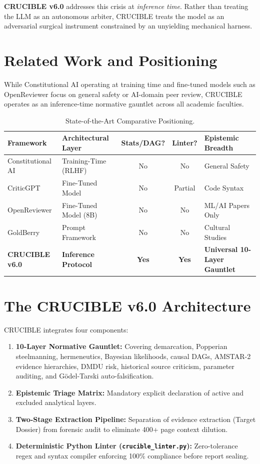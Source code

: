 \documentclass[11pt,a4paper]{article}
\begin{document}
\textbf{CRUCIBLE v6.0} addresses this crisis at \textit{inference time}. Rather than treating the LLM as an autonomous arbiter, CRUCIBLE treats the model as an adversarial surgical instrument constrained by an unyielding mechanical harness.

\section{Related Work and Positioning}
While Constitutional AI operating at training time and fine-tuned models such as OpenReviewer focus on general safety or AI-domain peer review, CRUCIBLE operates as an inference-time normative gauntlet across all academic faculties.

\begin{table}[t]
\centering
\small
\begin{tabularx}{\textwidth}{l p{3.2cm} c c X}
\toprule
\textbf{Framework} & \textbf{Architectural Layer} & \textbf{Stats/DAG?} & \textbf{Linter?} & \textbf{Epistemic Breadth} \\
\midrule
Constitutional AI & Training-Time (RLHF) & No & No & General Safety \\
CriticGPT & Fine-Tuned Model & No & Partial & Code Syntax \\
OpenReviewer & Fine-Tuned Model (8B) & No & No & ML/AI Papers Only \\
GoldBerry & Prompt Framework & No & No & Cultural Studies \\
\textbf{CRUCIBLE v6.0} & \textbf{Inference Protocol} & \textbf{Yes} & \textbf{Yes} & \textbf{Universal 10-Layer Gauntlet} \\
\bottomrule
\end{tabularx}
\caption{State-of-the-Art Comparative Positioning.}
\label{tab:sota}
\end{table}

\section{The CRUCIBLE v6.0 Architecture}
CRUCIBLE integrates four components:
\begin{enumerate}[noitemsep]
    \item \textbf{10-Layer Normative Gauntlet:} Covering demarcation, Popperian steelmanning, hermeneutics, Bayesian likelihoods, causal DAGs, AMSTAR-2 evidence hierarchies, DMDU risk, historical source criticism, parameter auditing, and G\"odel-Tarski auto-falsification.
    \item \textbf{Epistemic Triage Matrix:} Mandatory explicit declaration of active and excluded analytical layers.
    \item \textbf{Two-Stage Extraction Pipeline:} Separation of evidence extraction (Target Dossier) from forensic audit to eliminate 400+ page context dilution.
    \item \textbf{Deterministic Python Linter (\texttt{crucible\_linter.py}):} Zero-tolerance regex and syntax compiler enforcing 100\% compliance before report sealing.
\end{enumerate}
\end{document}
